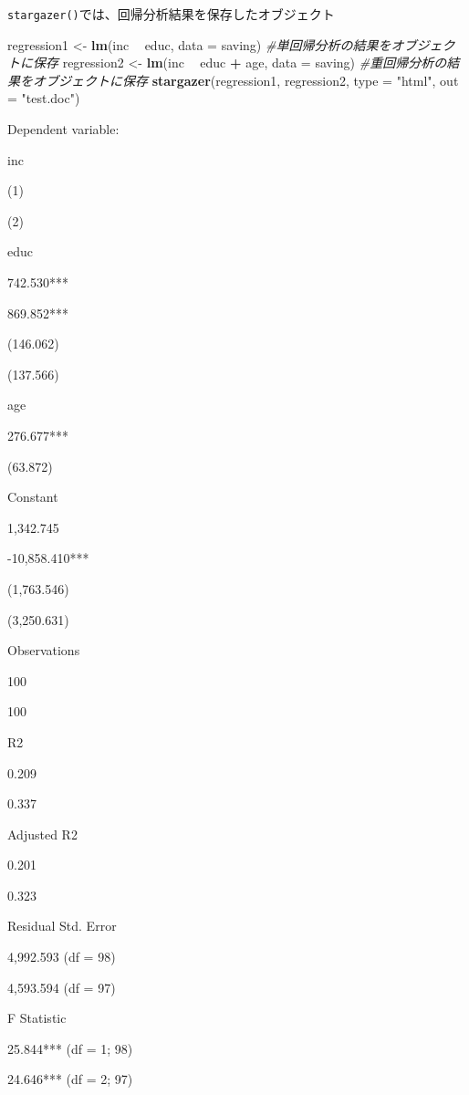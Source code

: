\documentclass[]{book}
\newenvironment{Shaded}{\begin{snugshade}}{\end{snugshade}}
\newcommand{\KeywordTok}[1]{\textcolor[rgb]{0.13,0.29,0.53}{\textbf{#1}}}
\newcommand{\DataTypeTok}[1]{\textcolor[rgb]{0.13,0.29,0.53}{#1}}
\newcommand{\StringTok}[1]{\textcolor[rgb]{0.31,0.60,0.02}{#1}}
\newcommand{\CommentTok}[1]{\textcolor[rgb]{0.56,0.35,0.01}{\textit{#1}}}
\newcommand{\OperatorTok}[1]{\textcolor[rgb]{0.81,0.36,0.00}{\textbf{#1}}}
\newcommand{\NormalTok}[1]{#1}
\begin{document}
\texttt{stargazer()}では、回帰分析結果を保存したオブジェクト

\begin{Shaded}
\begin{Highlighting}[]
\NormalTok{regression1 <-}\StringTok{ }\KeywordTok{lm}\NormalTok{(inc }\OperatorTok{~}\StringTok{ }\NormalTok{educ, }\DataTypeTok{data =}\NormalTok{ saving) }\CommentTok{#単回帰分析の結果をオブジェクトに保存}
\NormalTok{regression2 <-}\StringTok{ }\KeywordTok{lm}\NormalTok{(inc }\OperatorTok{~}\StringTok{ }\NormalTok{educ }\OperatorTok{+}\StringTok{ }\NormalTok{age, }\DataTypeTok{data =}\NormalTok{ saving) }\CommentTok{#重回帰分析の結果をオブジェクトに保存}
\KeywordTok{stargazer}\NormalTok{(regression1, regression2, }\DataTypeTok{type =} \StringTok{"html"}\NormalTok{, }\DataTypeTok{out =} \StringTok{"test.doc"}\NormalTok{)}
\end{Highlighting}
\end{Shaded}

Dependent variable:

inc

(1)

(2)

educ

742.530***

869.852***

(146.062)

(137.566)

age

276.677***

(63.872)

Constant

1,342.745

-10,858.410***

(1,763.546)

(3,250.631)

Observations

100

100

R2

0.209

0.337

Adjusted R2

0.201

0.323

Residual Std. Error

4,992.593 (df = 98)

4,593.594 (df = 97)

F Statistic

25.844*** (df = 1; 98)

24.646*** (df = 2; 97)
\end{document}
